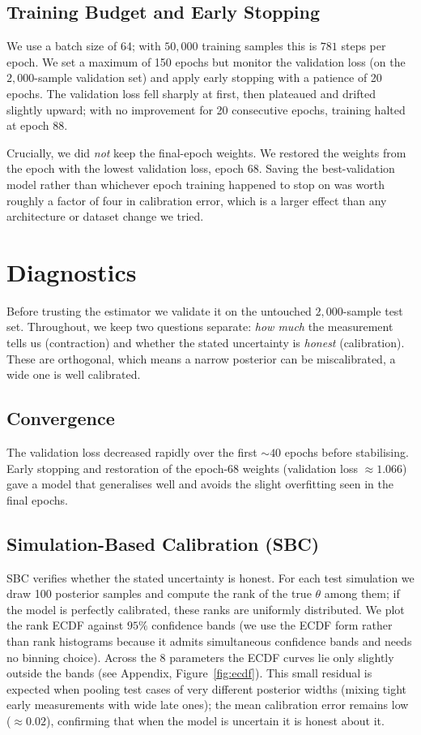 \documentclass[12pt]{article}
\begin{document}
\subsection{Training Budget and Early Stopping}
We use a batch size of 64; with $50{,}000$ training samples this is $781$ steps per epoch. We set a
maximum of 150 epochs but monitor the validation loss (on the $2{,}000$-sample validation set) and
apply early stopping with a patience of 20 epochs. The validation loss fell sharply at first, then
plateaued and drifted slightly upward; with no improvement for 20 consecutive epochs, training
halted at epoch 88.
 
Crucially, we did \emph{not} keep the final-epoch weights. We restored the weights from the epoch
with the lowest validation loss, epoch 68. Saving the best-validation model rather than whichever
epoch training happened to stop on was worth roughly a factor of four in calibration error, which is a
larger effect than any architecture or dataset change we tried.
 

 
\section{Diagnostics}
Before trusting the estimator we validate it on the untouched $2{,}000$-sample test set. Throughout,
we keep two questions separate: \emph{how much} the measurement tells us (contraction) and whether
the stated uncertainty is \emph{honest} (calibration). These are orthogonal, which means a narrow posterior can
be miscalibrated, a wide one is well calibrated.
 
\subsection{Convergence}
The validation loss decreased rapidly over the first ${\sim}40$ epochs before stabilising. Early
stopping and restoration of the epoch-68 weights (validation loss $\approx 1.066$) gave a model that
generalises well and avoids the slight overfitting seen in the final epochs.
 
\subsection{Simulation-Based Calibration (SBC)}
SBC verifies whether the stated uncertainty is honest. For each test simulation we draw 100 posterior
samples and compute the rank of the true $\theta$ among them; if the model is perfectly calibrated,
these ranks are uniformly distributed. We plot the rank ECDF against $95\%$ confidence bands (we use
the ECDF form rather than rank histograms because it admits simultaneous confidence bands and needs no
binning choice). Across the 8 parameters the ECDF curves lie only slightly outside the bands
(see Appendix, Figure~\ref{fig:ecdf}). This small residual is expected when pooling test cases of very different
posterior widths (mixing tight early measurements with wide late ones); the mean calibration error
remains low ($\approx 0.02$), confirming that when the model is uncertain it is honest about it.
 
\end{document}
